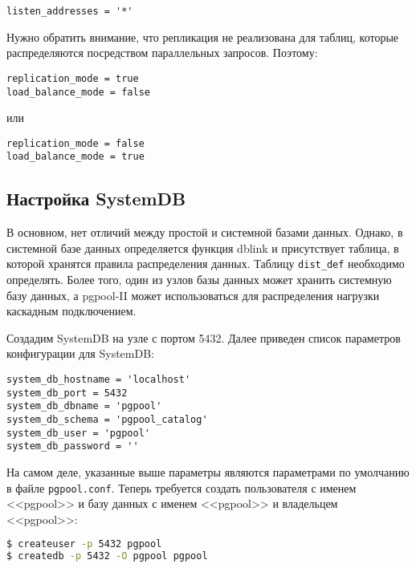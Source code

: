 \begin{lstlisting}[label=lst:pgpool23,caption=Настройка параллельного запроса]
listen_addresses = '*'
\end{lstlisting}

Нужно обратить внимание, что репликация не реализована для таблиц, которые распределяются посредством параллельных запросов. Поэтому:

\begin{lstlisting}[label=lst:pgpool24,caption=Настройка параллельного запроса]
replication_mode = true
load_balance_mode = false
\end{lstlisting}

или

\begin{lstlisting}[label=lst:pgpool25,caption=Настройка параллельного запроса]
replication_mode = false
load_balance_mode = true
\end{lstlisting}

\subsection{Настройка SystemDB}

В основном, нет отличий между простой и системной базами данных. Однако, в системной базе данных определяется функция dblink и присутствует таблица, в которой хранятся правила распределения данных. Таблицу \lstinline!dist_def! необходимо определять. Более того, один из узлов базы данных может хранить системную базу данных, а pgpool-II может использоваться для распределения нагрузки каскадным подключением.

Создадим SystemDB на узле с портом 5432. Далее приведен список параметров конфигурации для SystemDB:

\begin{lstlisting}[label=lst:pgpool26,caption=Настройка SystemDB]
system_db_hostname = 'localhost'
system_db_port = 5432
system_db_dbname = 'pgpool'
system_db_schema = 'pgpool_catalog'
system_db_user = 'pgpool'
system_db_password = ''
\end{lstlisting}

На самом деле, указанные выше параметры являются параметрами по умолчанию в файле \lstinline!pgpool.conf!. Теперь требуется создать пользователя с именем <<pgpool>> и базу данных с именем <<pgpool>> и владельцем <<pgpool>>:

\begin{lstlisting}[language=Bash,label=lst:pgpool27,caption=Настройка SystemDB]
$ createuser -p 5432 pgpool
$ createdb -p 5432 -O pgpool pgpool
\end{lstlisting}


